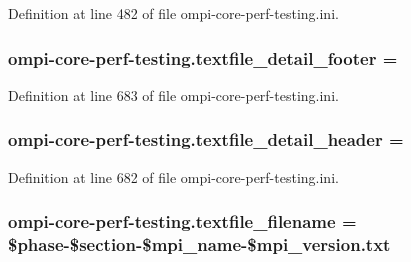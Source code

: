Definition at line 482 of file ompi-\/core-\/perf-\/testing.\-ini.

\hypertarget{namespaceompi-core-perf-testing_a819371d649ceadb28bf2e694046c48ac}{
\subsubsection[{textfile\-\_\-detail\-\_\-footer}]{\setlength{\rightskip}{0pt plus 5cm}ompi-\/core-\/perf-\/testing.\-textfile\-\_\-detail\-\_\-footer =}}\label{namespaceompi-core-perf-testing_a819371d649ceadb28bf2e694046c48ac}


Definition at line 683 of file ompi-\/core-\/perf-\/testing.\-ini.

\hypertarget{namespaceompi-core-perf-testing_a488fdd6dd5b7e9ed4f94831bd65fd3d7}{
\subsubsection[{textfile\-\_\-detail\-\_\-header}]{\setlength{\rightskip}{0pt plus 5cm}ompi-\/core-\/perf-\/testing.\-textfile\-\_\-detail\-\_\-header =}}\label{namespaceompi-core-perf-testing_a488fdd6dd5b7e9ed4f94831bd65fd3d7}


Definition at line 682 of file ompi-\/core-\/perf-\/testing.\-ini.

\hypertarget{namespaceompi-core-perf-testing_a3d97b532fd8ff90da601ffb1978657b0}{
\subsubsection[{textfile\-\_\-filename}]{\setlength{\rightskip}{0pt plus 5cm}ompi-\/core-\/perf-\/testing.\-textfile\-\_\-filename = \$phase-\/\$section-\/\$mpi\-\_\-name-\/\$mpi\-\_\-version.\-txt}}\label{namespaceompi-core-perf-testing_a3d97b532fd8ff90da601ffb1978657b0}


